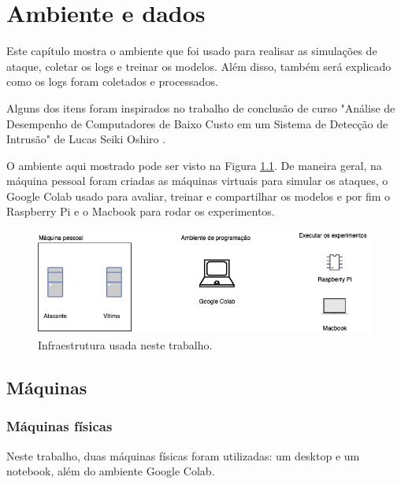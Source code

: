 
\chapter{Ambiente e dados}
\label{cap:data}

Este capítulo mostra o ambiente que foi usado para realisar as simulações de ataque,
coletar os logs e treinar os modelos. Além disso, também será explicado como os logs 
foram coletados e processados.

Alguns dos itens foram inspirados no trabalho de conclusão de curso "Análise de 
Desempenho de Computadores de Baixo Custo em um Sistema de Detecção de Intrusão" de 
Lucas Seiki Oshiro \cite{tcc:lucas}.

O ambiente aqui mostrado pode ser visto na Figura \ref{fig:arquitetura_total}. De maneira geral,
na máquina pessoal foram criadas as máquinas virtuais para simular os ataques, o Google Colab 
usado para avaliar, treinar e compartilhar os modelos e por fim o Raspberry Pi e o Macbook 
para rodar os experimentos.

\begin{figure}
    \centering
    \includegraphics[width=1\textwidth]{figuras/arquitetura_total.png}
    \caption{Infraestrutura usada neste trabalho. \label{fig:arquitetura_total}}
\end{figure}


\section{Máquinas}

\subsection{Máquinas físicas}

Neste trabalho, duas máquinas físicas foram utilizadas: um desktop e um notebook, além do ambiente Google Colab. 

